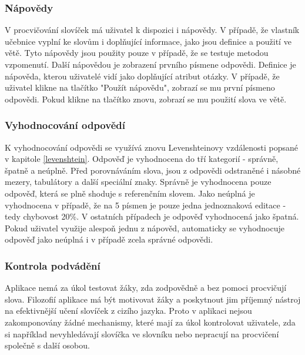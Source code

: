 \documentclass[a4paper,11pt,titlepage,fleqn]{article}
\begin{document}
        \subsubsection{Nápovědy}
            V procvičování slovíček má uživatel k dispozici i nápovědy. V případě, že vlastník učebnice vyplní ke slovům i doplňující informace, jako jsou definice a použití ve větě. Tyto nápovědy jsou použity pouze v případě, že se testuje metodou vzpomenutí. Další nápovědou je zobrazení prvního písmene odpovědi. Definice je nápověda, kterou uživatelé vidí jako doplňující atribut otázky. V případě, že uživatel klikne na tlačítko "Použít nápovědu", zobrazí se mu první písmeno odpovědi. Pokud klikne na tlačítko znovu, zobrazí se mu použití slova ve větě.

        \subsubsection{Vyhodnocování odpovědí}
            K vyhodnocování odpovědi se využívá znovu Levenshteinovy vzdálenosti popsané v kapitole \ref{levenshtein}. Odpověď je vyhodnocena do tří kategorií - správně, špatně a neúplně. Před porovnáváním slova, jsou z odpovědi odstraněné i násobné mezery, tabulátory a další speciální znaky. Správně je vyhodnocena pouze odpověď, která se plně shoduje s referenčním slovem. Jako neúplná je vyhodnocena v případě, že na 5 písmen je pouze jedna jednoznaková editace - tedy chybovost 20\%. V ostatních případech je odpověď vyhodnocená jako špatná. Pokud uživatel využije alespoň jednu z nápověd, automaticky se vyhodnocuje odpověď jako neúplná i v případě zcela správné odpovědi. 

        \subsubsection{Kontrola podvádění}
            Aplikace nemá za úkol testovat žáky, zda zodpovědně a bez pomoci procvičují slova. Filozofií aplikace má být motivovat žáky a poskytnout jim příjemný nástroj na efektivnější učení slovíček z cizího jazyka. Proto v aplikaci nejsou zakomponovány žádné mechanismy, které mají za úkol kontrolovat uživatele, zda si například nevyhledávají slovíčka ve slovníku nebo nepracují na procvičení společně s další osobou. 
\end{document}

